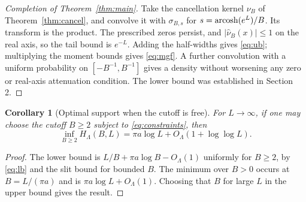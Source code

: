 \documentclass[11pt]{article}
\newtheorem{corollary}[theorem]{Corollary}
\theoremstyle{definition}\newtheorem{definition}[theorem]{Definition}
\begin{document}
\begin{proof}[Completion of Theorem~\ref{thm:main}]
Take the cancellation kernel $\nu_B$ of Theorem~\ref{thm:cancel}, and convolve it with $\sigma_{B,s}$ for $s=\operatorname{arcosh}(e^L)/B$. Its transform is the product. The prescribed zeros persist, and $|\widehat\nu_B(x)|\le1$ on the real axis, so the tail bound is $e^{-L}$. Adding the half-widths gives \eqref{eq:ub}; multiplying the moment bounds gives \eqref{eq:mgf}. A further convolution with a uniform probability on $[-B^{-1},B^{-1}]$ gives a density without worsening any zero or real-axis attenuation condition. The lower bound was established in Section 2.
\end{proof}

\begin{corollary}[Optimal support when the cutoff is free]\label{cor:free}
For $L\to\infty$, if one may choose the cutoff $B\ge2$ subject to \eqref{eq:constraints}, then
\[
 \inf_{B\ge2}H_\Lambda(B,L)=\pi a\log L+O_\Lambda(1+\log\log L).
\]
\end{corollary}
\begin{proof}
The lower bound is $L/B+\pi a\log B-O_\Lambda(1)$ uniformly for $B\ge2$, by \eqref{eq:lb} and the slit bound for bounded $B$. The minimum over $B>0$ occurs at $B=L/(\pi a)$ and is $\pi a\log L+O_\Lambda(1)$. Choosing that $B$ for large $L$ in the upper bound gives the result.
\end{proof}
\end{document}
